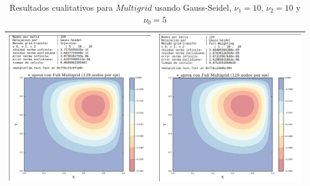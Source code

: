 \documentclass[letter,10pt]{article}
\begin{document}
\begin{table}[H]
\centering
\caption{Resultados cualitativos para $Multigrid$ usando Gauss-Seidel, $\nu_1=10$, $\nu_2=10$ y $\nu_0=5$}
\begin{tabular}[t]{|c|c|}
\hline
\includegraphics[scale=0.55]{img/fmg/inject10105}& \includegraphics[scale=0.55]{img/fmg/FW10105}\\ \hline
\end{tabular}

\label{cualitmg10105}
\end{table}
\end{document}
